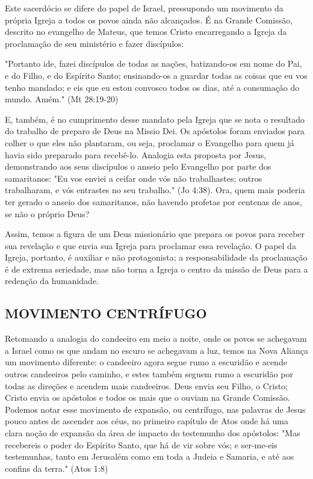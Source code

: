 \documentclass[
    article,            %
	12pt,				%
	oneside,			%
	a4paper,			%
	chapter=TITLE,		%
	section=TITLE,		%
	english,			%
	french,				%
	spanish,			%
	brazil				%
	]{abntex2}
\begin{document}
Este sacerdócio se difere do papel de Israel, pressupondo um movimento da própria Igreja a todos os povos ainda não alcançados. É na Grande Comissão, descrito no evangelho de Mateus, que temos Cristo encarregando a Igreja da proclamação de seu ministério e fazer discípulos:
\begin{citacao}
"Portanto ide, fazei discípulos de todas as nações, batizando-os em nome do Pai, e do Filho, e do Espírito Santo; ensinando-os a guardar todas as coisas que eu vos tenho mandado; e eis que eu estou convosco todos os dias, até a consumação do mundo. Amém." (Mt 28:19-20)
\end{citacao}
E, também, é no cumprimento desse mandato pela Igreja que se nota o resultado do trabalho de preparo de Deus na Missio Dei. Os apóstolos foram enviados para colher o que eles não plantaram, ou seja, proclamar o Evangelho para quem já havia sido preparado para recebê-lo. Analogia esta proposta por Jesus, demonstrando aos seus discípulos o anseio pelo Evangelho por parte dos samaritanos: "Eu vos enviei a ceifar onde vós não trabalhastes; outros trabalharam, e vós entrastes no seu trabalho." (Jo 4:38). Ora, quem mais poderia ter gerado o anseio dos samaritanos, não havendo profetas por centenas de anos, se não o próprio Deus?

Assim, temos a figura de um Deus missionário que prepara os povos para receber sua revelação e que envia sua Igreja para proclamar essa revelação. O papel da Igreja, portanto, é auxiliar e não protagonista; a responsabilidade da proclamação é de extrema seriedade, mas não torna a Igreja o centro da missão de Deus para a redenção da humanidade.

\subsection{MOVIMENTO CENTRÍFUGO}
Retomando a analogia do candeeiro em meio a noite, onde os povos se achegavam a Israel como os que andam no escuro se achegavam a luz, temos na Nova Aliança um movimento diferente: o candeeiro agora segue rumo a escuridão e acende outros candeeiros pelo caminho, e estes também seguem rumo a escuridão por todas as direções e acendem mais candeeiros. Deus envia seu Filho, o Cristo; Cristo envia os apóstolos e todos os mais que o ouviam na Grande Comissão. Podemos notar esse movimento de expansão, ou centrífugo, nas palavras de Jesus pouco antes de ascender aos céus, no primeiro capítulo de Atos onde há uma clara noção de expansão da área de impacto do testemunho dos apóstolos: "Mas recebereis o poder do Espírito Santo, que há de vir sobre vós; e ser-me-eis testemunhas, tanto em Jerusalém como em toda a Judeia e Samaria, e até aos confins da terra." (Atos 1:8)
\end{document}
